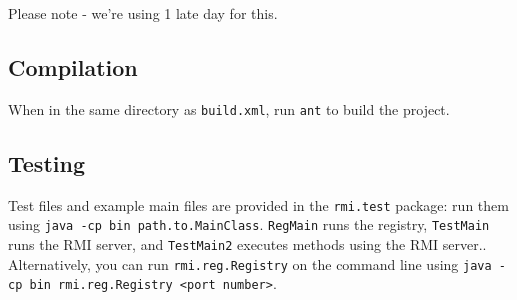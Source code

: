 \documentclass{scrartcl}
\begin{document}
Please note - we're using 1 late day for this.

\subsection{Compilation}

When in the same directory as \verb$build.xml$, run \verb$ant$ to build the project.

\subsection{Testing}

Test files and example main files are provided in the \verb$rmi.test$ package: run them using \verb$java -cp bin path.to.MainClass$.  \verb$RegMain$ runs the registry, \verb$TestMain$ runs the RMI server, and \verb$TestMain2$ executes methods using the RMI server.. Alternatively, you can run \verb$rmi.reg.Registry$ on the command line using \verb$java -cp bin rmi.reg.Registry <port number>$.
\end{document}
